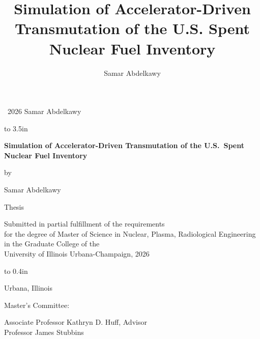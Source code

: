 \documentclass[edeposit,fullpage]{uiucthesis2021}
\begin{document}
\title{Simulation of Accelerator-Driven Transmutation of the U.S. Spent Nuclear Fuel Inventory}
\author{Samar Abdelkawy}
\msthesis %

\begin{titlepage}
    \vspace*{\fill}
    \begin{center}
        \textcopyright\ 2026 Samar Abdelkawy
    \end{center}
    \vspace*{\fill}
\end{titlepage}

\begin{titlepage}
    \linespread{1.2}\selectfont
    \begin{center}
        \vbox to 3.5in{%
            {\bfseries Simulation of Accelerator-Driven Transmutation of the
             U.S.\ Spent Nuclear Fuel Inventory\par}
            \vskip 12pt
            by\par
            \vskip 12pt
            {Samar Abdelkawy\par}
            \vfill
        }%
        {Thesis\par}
        \vspace{12pt}
        Submitted in partial fulfillment of the requirements\\
        for the degree of Master of Science in Nuclear, Plasma, Radiological Engineering\\
        in the Graduate College of the\\
        University of Illinois Urbana-Champaign, 2026\par
        \vspace{12pt}
        \vbox to 0.4in{%
            {Urbana, Illinois\par}
            \vfill
        }%
    \end{center}
    \begin{flushleft}
        Master's Committee:\par
        \hspace*{0.5in}Associate Professor Kathryn D. Huff, Advisor\\
        \hspace*{0.5in}Professor James Stubbins
    \end{flushleft}
\end{titlepage}
\end{document}
